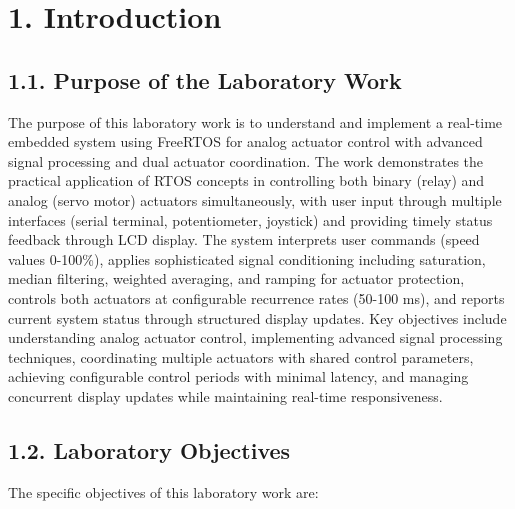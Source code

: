 \documentclass[12pt]{article}
\begin{document}
\section*{1. Introduction}

\subsection*{1.1. Purpose of the Laboratory Work}

The purpose of this laboratory work is to understand and implement a real-time embedded system using FreeRTOS for analog actuator control with advanced signal processing and dual actuator coordination. The work demonstrates the practical application of RTOS concepts in controlling both binary (relay) and analog (servo motor) actuators simultaneously, with user input through multiple interfaces (serial terminal, potentiometer, joystick) and providing timely status feedback through LCD display. The system interprets user commands (speed values 0-100\%), applies sophisticated signal conditioning including saturation, median filtering, weighted averaging, and ramping for actuator protection, controls both actuators at configurable recurrence rates (50-100 ms), and reports current system status through structured display updates. Key objectives include understanding analog actuator control, implementing advanced signal processing techniques, coordinating multiple actuators with shared control parameters, achieving configurable control periods with minimal latency, and managing concurrent display updates while maintaining real-time responsiveness.

\subsection*{1.2. Laboratory Objectives}

The specific objectives of this laboratory work are:
\end{document}
